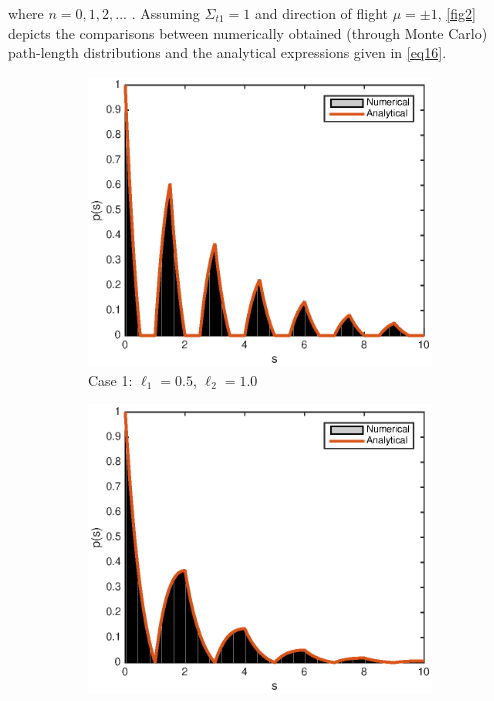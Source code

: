 \documentclass[12pt]{article}
\begin{document}
where $n=0, 1, 2, ...$ .
Assuming $\Sigma_{t1}=1$ and direction of flight $\mu=\pm 1$, \cref{fig2} depicts the comparisons between numerically obtained (through Monte Carlo) path-length distributions and the analytical expressions given in \cref{eq16}. 
\begin{figure}[hbt]
    \centering
    \begin{subfigure}{0.495\textwidth}
        \centering
        \includegraphics[width=\textwidth]{fig2a.eps}
        \caption{Case 1: $\ell_1=0.5$, $\ell_2=1.0$}
        \label{fig2a}
    \end{subfigure}
    \hfill
    \begin{subfigure}{0.495\textwidth}
        \centering
        \includegraphics[width=\textwidth]{fig2b.eps}

\end{subfigure}
\end{figure}
\end{document}
